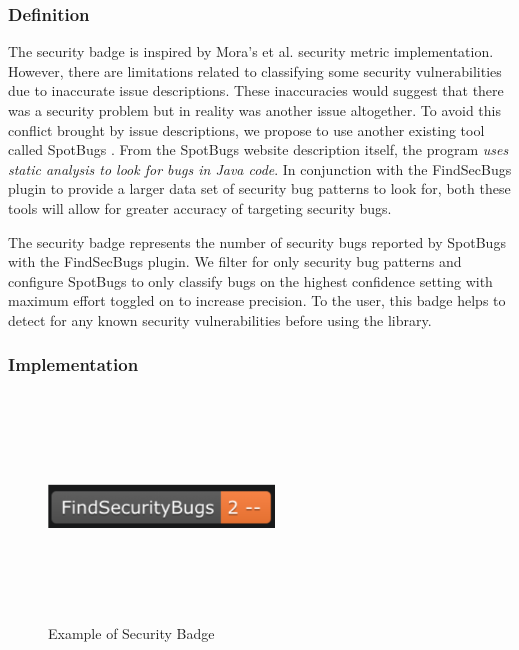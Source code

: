 \documentclass[12pt, letterpaper]{article}
\begin{document}
\subsubsection{Definition}
The security badge is inspired by Mora's et al. \cite{metrics} security metric implementation.
However, there are limitations related to classifying some security vulnerabilities due to inaccurate
issue descriptions. These inaccuracies would suggest that there was a security problem but in reality was another issue altogether.
To avoid this conflict brought by issue descriptions, 
we propose to use another existing tool called SpotBugs \cite{spotbugs}.
From the SpotBugs \cite{spotbugs} website description itself, the program \textit{uses static analysis to look for bugs in Java code}.
In conjunction with the FindSecBugs \cite{findsecbugs} plugin to provide a larger data set of security bug patterns to look for, 
both these tools will allow for greater accuracy of targeting security bugs.

The security badge represents the number of security bugs reported by SpotBugs \cite{spotbugs} with the FindSecBugs \cite{findsecbugs} plugin.
We filter for only security bug patterns and configure SpotBugs to only classify bugs on the highest confidence setting
with maximum effort toggled on to increase precision. To the user, this badge helps to detect
for any known security vulnerabilities before using the library. 

\subsubsection{Implementation}

\begin{figure}[!htb]
    \centerline{
        \includegraphics[width=6cm,height=6cm,keepaspectratio=true]{findsecbugsbadge}
    }
    \caption{
        Example of Security Badge
    }
    \label{findsecbugsbadge}
\end{figure}
\end{document}

